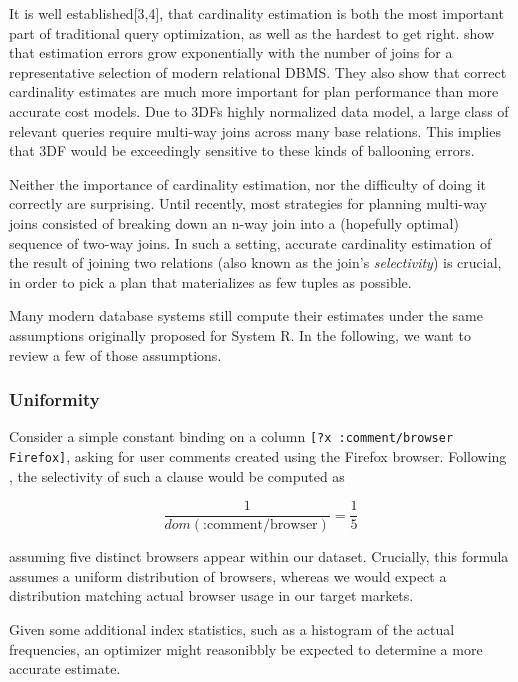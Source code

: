 \documentclass[../index.tex]{subfiles}
\begin{document}
It is well established[3,4], that cardinality estimation is both the
most important part of traditional query optimization, as well as the
hardest to get right. \cite{leis2015good} show that estimation errors
grow exponentially with the number of joins for a representative
selection of modern relational DBMS. They also show that correct
cardinality estimates are much more important for plan performance
than more accurate cost models. Due to 3DFs highly normalized data
model, a large class of relevant queries require multi-way joins
across many base relations. This implies that 3DF would be exceedingly
sensitive to these kinds of ballooning errors.

Neither the importance of cardinality estimation, nor the difficulty
of doing it correctly are surprising. Until recently, most strategies
for planning multi-way joins consisted of breaking down an n-way join
into a (hopefully optimal) sequence of two-way joins. In such a
setting, accurate cardinality estimation of the result of joining two
relations (also known as the join's \emph{selectivity}) is crucial, in
order to pick a plan that materializes as few tuples as possible.

Many modern database systems still compute their estimates under the
same assumptions originally proposed for System R. In the following,
we want to review a few of those assumptions.

\subsubsection{Uniformity}

Consider a simple constant binding on a column \texttt{[?x
    :comment/browser Firefox]}, asking for user comments created using
the Firefox browser. Following \cite{selinger1979access}, the
selectivity of such a clause would be computed as

\begin{equation}
  \dfrac{1}{dom(\text{:comment/browser})} = \dfrac{1}{5}
\end{equation}

assuming five distinct browsers appear within our dataset. Crucially,
this formula assumes a uniform distribution of browsers, whereas we
would expect a distribution matching actual browser usage in our
target markets.

Given some additional index statistics, such as a histogram of the
actual frequencies, an optimizer might reasonibbly be expected to
determine a more accurate estimate.
\end{document}
